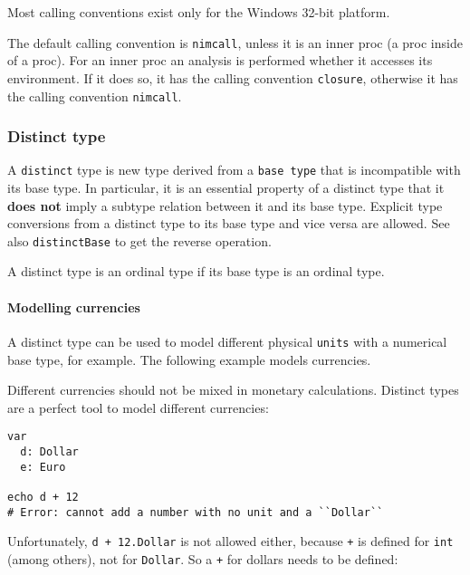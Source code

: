 Most calling conventions exist only for the Windows 32-bit platform.

The default calling convention is \texttt{nimcall}, unless it is an
inner proc (a proc inside of a proc). For an inner proc an analysis is
performed whether it accesses its environment. If it does so, it has the
calling convention \texttt{closure}, otherwise it has the calling
convention \texttt{nimcall}.

\hypertarget{distinct-type}{%
\subsubsection{Distinct type}\label{distinct-type}}

A \texttt{distinct} type is new type derived from a \texttt{base\ type}
that is incompatible with its base type. In particular, it is an
essential property of a distinct type that it \textbf{does not} imply a
subtype relation between it and its base type. Explicit type conversions
from a distinct type to its base type and vice versa are allowed. See
also \texttt{distinctBase} to get the reverse operation.

A distinct type is an ordinal type if its base type is an ordinal type.

\hypertarget{modelling-currencies}{%
\paragraph{Modelling currencies}\label{modelling-currencies}}

A distinct type can be used to model different physical \texttt{units}
with a numerical base type, for example. The following example models
currencies.

Different currencies should not be mixed in monetary calculations.
Distinct types are a perfect tool to model different currencies:

\begin{verbatim}
var
  d: Dollar
  e: Euro

echo d + 12
# Error: cannot add a number with no unit and a ``Dollar``
\end{verbatim}

Unfortunately, \texttt{d\ +\ 12.Dollar} is not allowed either, because
\texttt{+} is defined for \texttt{int} (among others), not for
\texttt{Dollar}. So a \texttt{+} for dollars needs to be defined:

\begin{verbatim}
\end{verbatim}

